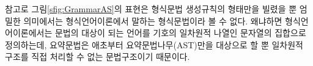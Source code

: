 \documentclass[b5paper,chapter,figtabcapt]{oblivoir}
\begin{document}
참고로 그림\;\ref{sfig:GrammarAS}의 표현은 형식문법 생성규칙의
형태만을 빌렸을 뿐 엄밀한 의미에서는 형식언어이론에서 말하는
형식문법이라 볼 수 없다. 왜냐하면 형식언어이론에서는 문법의
대상이 되는 언어를 기호의 일차원적 나열인 문자열의 집합으로
정의하는데, 요약문법은 애초부터 요약문법나무(AST)만을 대상으로
할 뿐 일차원적 구조를 직접 처리할 수 없는 문법구조이기 때문이다.

\end{document}
